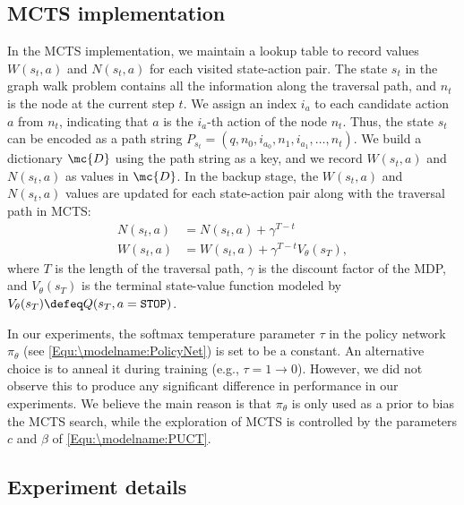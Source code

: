 \subsection{MCTS implementation}
\label{Appendix:AlgDetails:MCTS}
In the MCTS implementation, we maintain a lookup table to record values $W(s_t, a)$ and $N(s_t, a)$ for each visited state-action pair. The state $s_t$ in the graph walk problem contains all the information along the traversal path, and $n_t$ is the node at the current step $t$.
We assign an index $i_a$ to each candidate action $a$ from $n_t$, indicating that $a$ is the $i_a$-th action of the node $n_t$. 
Thus, the state $s_t$ can be encoded as a path string $P_{s_t} = (q, n_0, i_{a_0}, n_1, i_{a_1}, \ldots, n_t)$.
We build a dictionary $\mc{D}$ using the path string as a key, and we record $W(s_t, a) $ and $N(s_t, a)$ as values in $\mc{D}$. %
In the backup stage, the $W(s_t,a)$ and $N(s_t,a)$ values are updated for each state-action pair along with the traversal path in MCTS:
\begin{align}
	N(s_t, a) &= N(s_t, a) + \gamma^{T-t}
	\label{Equ:Appendix:MCTS_backup_N}
	\\
	W(s_t, a) &= W(s_t, a) + \gamma^{T-t} V_{\theta}(s_{T}),
	\label{Equ:Appendix:MCTS_backup_W}
\end{align}
where $T$ is the length of the traversal path, $\gamma$ is the discount factor of the MDP, and $V_{\theta}(s_T)$ is the terminal state-value function modeled by $V_{\theta}(s_T) \defeq Q(s_T, a=\tt{STOP})$.

In our experiments, the softmax temperature parameter $\tau$ in the policy network $\pi_{\theta}$ (see \eqref{Equ:\modelname:PolicyNet}) is set to be a constant. An alternative choice is to anneal it during training (e.g., $\tau = 1 \rightarrow 0$). However, we did not observe this to produce any significant difference in performance in our experiments. We believe the main reason is that $\pi_{\theta}$ is only used as a prior to bias the MCTS search, while the exploration of MCTS is controlled by the parameters $c$ and $\beta$ of \eqref{Equ:\modelname:PUCT}.



\subsection{Experiment details}
\label{Appendix:exp_details}

